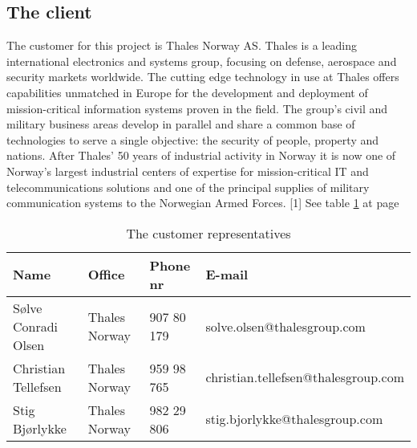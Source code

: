 \subsection{The client}
The customer for this project is Thales Norway AS. Thales is a leading international electronics and systems group, focusing on defense, aerospace and security markets worldwide. The cutting edge technology in use at Thales offers capabilities unmatched in Europe for the development and deployment of mission-critical information systems proven in the field. The group’s civil and military business areas develop in parallel and share a common base of technologies to serve a single objective: the security of people, property and nations.
\newline
\newline
After Thales’ 50 years of industrial activity in Norway it is now one of Norway’s largest industrial centers of expertise for mission-critical IT and telecommunications solutions and one of the principal supplies of military communication systems to the Norwegian Armed Forces. [1]
\newline
\newline
See table \ref{tab:customer} at page \pageref{tab:customer}
\begin{table}
\begin{tabular}{l|l|l|l}
\textbf{Name} & \textbf{Office} & \textbf{Phone nr} & \textbf{E-mail} \\ \hline \hline
Sølve Conradi Olsen & Thales Norway & 907 80 179 & solve.olsen@thalesgroup.com \\ \hline
Christian Tellefsen & Thales Norway & 959 98 765 & christian.tellefsen@thalesgroup.com \\ \hline
Stig Bjørlykke & Thales Norway & 982 29 806 & stig.bjorlykke@thalesgroup.com
\end{tabular}
\caption{The customer representatives} \label{tab:customer}
\end{table}

